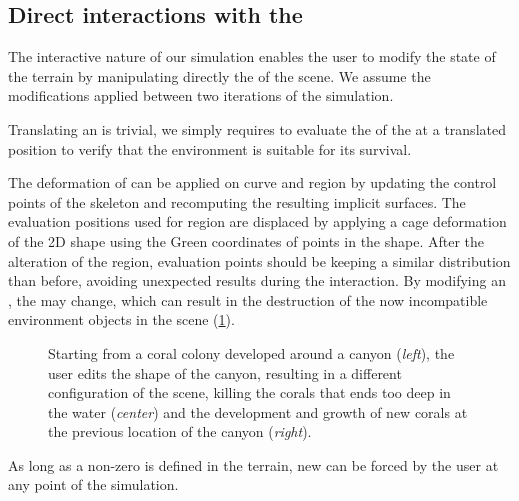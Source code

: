 \subsection{Direct interactions with the }
\label{sec:env-obj_manual-interaction}
The interactive nature of our simulation enables the user to modify the state of the terrain by manipulating directly the  of the scene. We assume the modifications applied between two iterations of the simulation.

Translating an  is trivial, we simply requires to evaluate the  of the  at a translated position to verify that the environment is suitable for its survival.

The deformation of  can be applied on curve and region  by updating the control points of the skeleton and recomputing the resulting implicit surfaces. The evaluation positions used for region  are displaced by applying a cage deformation of the 2D shape using the Green coordinates of points in the shape. After the alteration of the region, evaluation points should be keeping a similar distribution than before, avoiding unexpected results during the interaction.
By modifying an , the  may change, which can result in the destruction of the now incompatible environment objects in the scene (\cref{fig:env-obj_user-interaction}).

\begin{figure}
    \caption{Starting from a coral colony developed around a canyon (\textit{left}), the user edits the shape of the canyon, resulting in a different configuration of the scene, killing the corals that ends too deep in the water (\textit{center}) and the development and growth of new corals at the previous location of the canyon (\textit{right}). }
    \label{fig:env-obj_user-interaction}
\end{figure}

As long as a non-zero  is defined in the terrain, new  can be forced by the user at any point of the simulation. 

